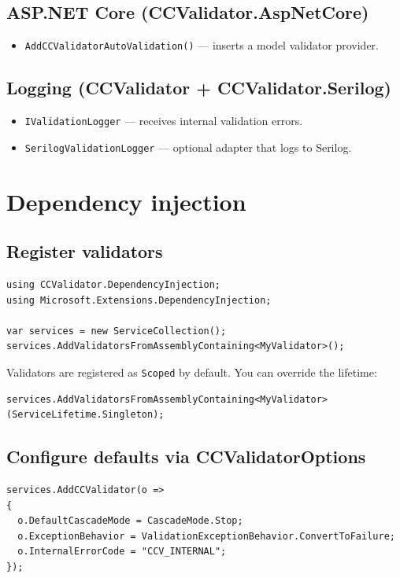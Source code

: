 \documentclass[12pt]{article}
\begin{document}
\subsection{ASP.NET Core (CCValidator.AspNetCore)}
\begin{itemize}[noitemsep]
  \item \texttt{AddCCValidatorAutoValidation()} --- inserts a model validator provider.
\end{itemize}

\subsection{Logging (CCValidator + CCValidator.Serilog)}
\begin{itemize}[noitemsep]
  \item \texttt{IValidationLogger} --- receives internal validation errors.
  \item \texttt{SerilogValidationLogger} --- optional adapter that logs to Serilog.
\end{itemize}

\section{Dependency injection}

\subsection{Register validators}
\begin{lstlisting}
using CCValidator.DependencyInjection;
using Microsoft.Extensions.DependencyInjection;

var services = new ServiceCollection();
services.AddValidatorsFromAssemblyContaining<MyValidator>();
\end{lstlisting}

Validators are registered as \texttt{Scoped} by default. You can override the lifetime:

\begin{lstlisting}
services.AddValidatorsFromAssemblyContaining<MyValidator>(ServiceLifetime.Singleton);
\end{lstlisting}

\subsection{Configure defaults via CCValidatorOptions}
\begin{lstlisting}
services.AddCCValidator(o =>
{
  o.DefaultCascadeMode = CascadeMode.Stop;
  o.ExceptionBehavior = ValidationExceptionBehavior.ConvertToFailure;
  o.InternalErrorCode = "CCV_INTERNAL";
});
\end{lstlisting}
\end{document}
